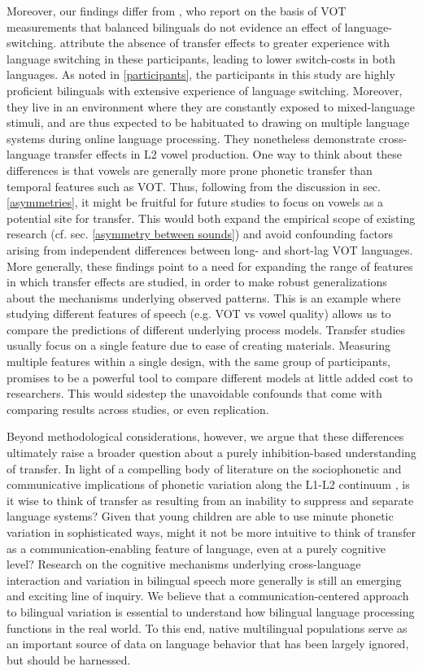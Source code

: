 \documentclass[12 pt]{article}
\begin{document}
Moreover, our findings differ from \cite{tsui2019impact}, who report on the basis of VOT measurements that balanced bilinguals do not evidence an effect of language-switching. \citeauthor{tsui2019impact} attribute the absence of transfer effects to greater experience with language switching in these participants, leading to lower switch-costs in both languages. As noted in \ref{participants}, the participants in this study are highly proficient bilinguals with extensive experience of language switching. Moreover, they live in an environment where they are constantly exposed to mixed-language stimuli, and are thus expected to be habituated to drawing on multiple language systems during online language processing. They nonetheless demonstrate cross-language transfer effects in L2 vowel production. One way to think about these differences is that vowels are generally more prone phonetic transfer than temporal features such as VOT. Thus, following from the discussion in sec. \ref{asymmetries}, it might be fruitful for future studies to focus on vowels as a potential site for transfer. This would both expand the empirical scope of existing research (cf. sec. \ref{asymmetry between sounds}) and avoid confounding factors arising from independent differences between long- and short-lag VOT languages. More generally, these findings point to a need for expanding the range of features in which transfer effects are studied, in order to make robust generalizations about the mechanisms underlying observed patterns. This is an example where studying different features of speech (e.g. VOT vs vowel quality) allows us to compare the predictions of different underlying process models. Transfer studies usually focus on a single feature due to ease of creating materials. Measuring multiple features within a single design, with the same group of participants, promises to be a powerful tool to compare different models at little added cost to researchers. This would sidestep the unavoidable confounds that come with comparing results across studies, or even replication.

Beyond methodological considerations, however, we argue that these differences ultimately raise a broader question about a purely inhibition-based understanding of transfer. In light of a compelling body of literature on the sociophonetic and communicative implications of phonetic variation along the L1-L2 continuum \citep[e.g.][]{khattab2013phonetic,agnihotri1979processes,stuart2011hybridity}, is it wise to think of transfer as resulting from an inability to suppress and separate language systems? Given that young children are able to use minute phonetic variation in sophisticated ways, might it not be more intuitive to think of transfer as a communication-enabling feature of language, even at a purely cognitive level? Research on the cognitive mechanisms underlying cross-language interaction and variation in bilingual speech more generally is still an emerging and exciting line of inquiry. We believe that a communication-centered approach to bilingual variation is essential to understand how bilingual language processing functions in the real world. To this end, native multilingual populations serve as an important source of data on language behavior that has been largely ignored, but should be harnessed. 
\end{document}
